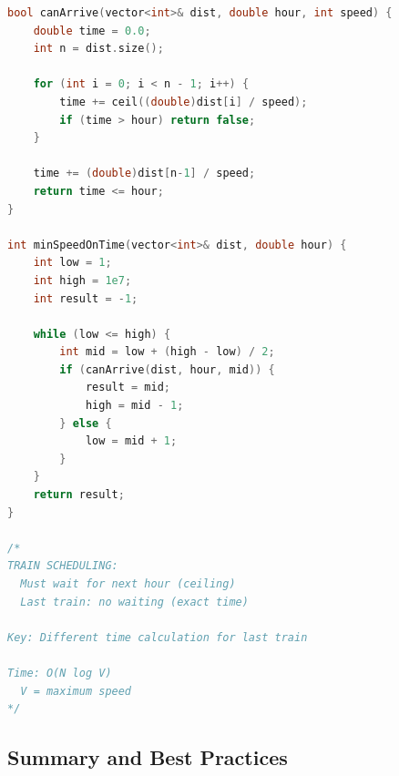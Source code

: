\documentclass[11pt,a4paper,oneside]{book}
\begin{document}
\begin{lstlisting}[language=C++, caption=Complete Complex Scheduling Solutions]
bool canArrive(vector<int>& dist, double hour, int speed) {
    double time = 0.0;
    int n = dist.size();
    
    for (int i = 0; i < n - 1; i++) {
        time += ceil((double)dist[i] / speed);
        if (time > hour) return false;
    }
    
    time += (double)dist[n-1] / speed;
    return time <= hour;
}

int minSpeedOnTime(vector<int>& dist, double hour) {
    int low = 1;
    int high = 1e7;
    int result = -1;
    
    while (low <= high) {
        int mid = low + (high - low) / 2;
        if (canArrive(dist, hour, mid)) {
            result = mid;
            high = mid - 1;
        } else {
            low = mid + 1;
        }
    }
    return result;
}

/*
TRAIN SCHEDULING:
  Must wait for next hour (ceiling)
  Last train: no waiting (exact time)

Key: Different time calculation for last train

Time: O(N log V)
  V = maximum speed
*/
\end{lstlisting}

\subsection{Summary and Best Practices}
\end{document}
